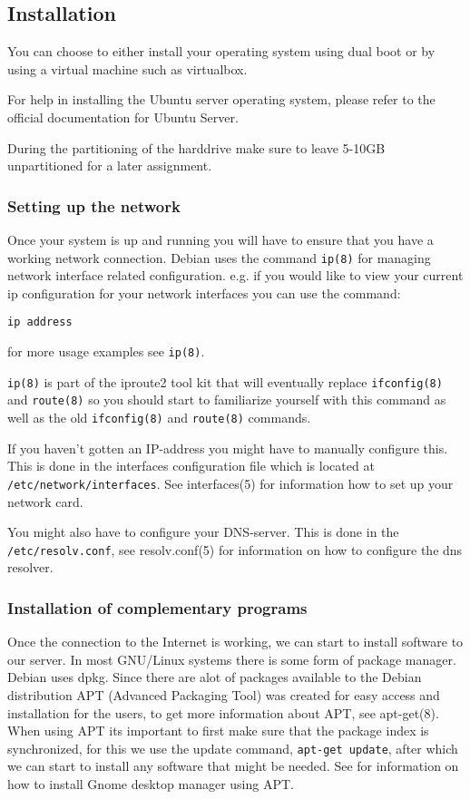 \documentclass[a4paper]{miunasgn}
\begin{document}
\subsection{Installation}
\label{subsec:Installation}
You can choose to either install your operating system using dual boot or by
using a virtual machine such as virtualbox\citep{vbox}.

For help in installing the Ubuntu server operating system, please refer to the
official documentation for Ubuntu Server\citep{ubuntuinstall}.

During the partitioning of the harddrive make sure to leave 5-10GB unpartitioned
for a later assignment.

\subsubsection{Setting up the network}
\label{subsubsec:Network}
Once your system is up and running you will have to ensure that you have a
working network connection. Debian uses the command \texttt{ip(8)} for managing
network interface related configuration.  e.g. if you would like to view your
current ip configuration for your network interfaces you can use the command:\\
\begin{center}
\texttt{ip address}
\end{center}
for more usage examples see \texttt{ip(8)}.

\texttt{ip(8)} is part of the iproute2 tool kit\citep{iproute2} that will 
eventually replace \texttt{ifconfig(8)} and \texttt{route(8)} so you should
start to familiarize yourself with this command as well as the old \texttt{ifconfig(8)} and \texttt{route(8)} commands.

If you haven't gotten an IP-address you might have to manually configure this.
This is done in the interfaces configuration file which is located at
\texttt{/etc/network/interfaces}. See interfaces(5) for information
how to set up your network card. 

You might also have to configure your DNS-server. This is done in the
 \texttt{/etc/resolv.conf}, see resolv.conf(5) for information on how to 
configure the dns resolver.

\subsubsection{Installation of complementary programs}
\label{subsubsec:complProg}
Once the connection to the Internet is working, we can start to install software
to our server.
In most GNU/Linux systems there is some form of package manager. Debian uses dpkg. 
Since there are alot of packages available to the Debian distribution APT 
(Advanced Packaging Tool) was created for easy access and installation for the
users, to get more information about APT, see apt-get(8).
When using APT its important to first make sure that the package index is
synchronized, for this we use the update command, \texttt{apt-get update}, after
which we can start to install any software that might be needed. 
See \citep{debiangnome} for information on how to install Gnome desktop manager using APT.
\newpage
\end{document}
